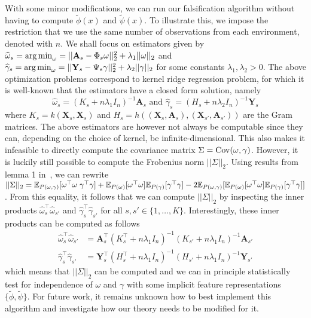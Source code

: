 \documentclass{article}
\begin{document}
With some minor modifications, we can run our falsification algorithm without having to compute $\widetilde{\phi}(x)$ and $\widetilde{\psi}(x)$. To illustrate this, we impose the restriction that we use the same number of observations from each environment, denoted with $n$. We shall focus on estimators given by $\widehat{\omega}_s = \operatorname*{arg\,min}_{\omega} = || \mathbf{A}_s - \Phi_s \omega||_2^2 + \lambda_{1} ||\omega||_2$ and $\widehat{\gamma}_s = \operatorname*{arg\,min}_{\omega} = || \mathbf{Y}_s - \Psi_s \gamma||_2^2 + \lambda_{2} ||\gamma||_2$ for some constants $\lambda_1,\lambda_2>0$. The above optimization problems correspond to kernel ridge regression problem, for which it is well-known that the estimators have a closed form solution, namely \begin{equation*}
\widehat{\omega}_s =(K_s+n\lambda_1 I_{n})^{-1}\mathbf{A}_s \text{ and } \widehat{\gamma}_s =(H_s+n\lambda_2 I_{n})^{-1}\mathbf{Y}_s
\end{equation*}
where $K_s=k(\mathbf{X}_s,\mathbf{X}_s)$ and $H_s=h((\mathbf{X}_s,\mathbf{A}_s), (\mathbf{X}_{s'},\mathbf{A}_{s'}))$ are the Gram matrices. The above estimators are however not always be computable since they can, depending on the choice of kernel, be infinite-dimensional. This also makes it infeasible to directly compute the covariance matrix $\Sigma=\mathrm{Cov}(\omega,\gamma)$. However, it is luckily still possible to compute the Frobenius norm $||\Sigma||_2$. Using results from lemma 1 in~\citet{gretton2005kernel}, we can rewrite $||\Sigma||_2 = \mathbb{E}_{P(\omega,\gamma)}[\omega^\top\omega\; \gamma^\top\gamma] + \mathbb{E}_{P(\omega)}[\omega^\top\omega]\mathbb{E}_{P(\gamma)}[ \gamma^\top\gamma] - 2 \mathbb{E}_{P(\omega,\gamma)}[\mathbb{E}_{P(\omega)}[\omega^\top\omega]\mathbb{E}_{P(\gamma)}[ \gamma^\top\gamma]]$. From this equality, it follows that we can compute $||\Sigma||_2$ by inspecting the inner products $\widehat{\omega}_s^\top \widehat{\omega}_{s'}$ and $\widehat{\gamma}_s^\top \widehat{\gamma}_{s'}$ for all $s,s'\in\{1,\dots,K\}$. Interestingly, these inner products can be computed as follows
\begin{align*}
    \widehat{\omega}_s^\top \widehat{\omega}_{s'} &= \mathbf{A}_s^\top (K_s^\top +n\lambda_1 I_{n})^{-1} (K_{s'}+n\lambda_1 I_{n})^{-1} \mathbf{A}_{s'}\\
    \widehat{\gamma}_s^\top \widehat{\gamma}_{s'} &= \mathbf{Y}_s^\top (H_s^\top +n\lambda_1 I_{n})^{-1} (H_{s'}+n\lambda_1 I_{n})^{-1} \mathbf{Y}_{s'}
\end{align*}
which means that $||\Sigma||_2$ can be computed and we can in principle statistically test for independence of $\omega$ and $\gamma$ with some implicit feature representations $\{\widetilde\phi, \widetilde\psi\}$. For future work, it remains unknown how to best implement this algorithm and investigate how our theory needs to be modified for it.
\end{document}
